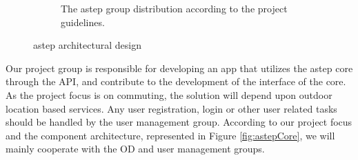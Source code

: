 \begin{figure}[h!]
\begin{subfigure}[b]{0.48\textwidth}
		\caption{The \gls{astep} group distribution according to the project guidelines.}
		\label{fig:astepGroups}
	\end{subfigure}
	\caption{\gls{astep} architectural design}
	\label{fig:astepArchitecture}
\end{figure}

Our project group is responsible for developing an app that utilizes the \gls{astep} core through the API, and contribute to the development of the interface of the core.
As the project focus is on commuting, the solution will depend upon outdoor location based services.
Any user registration, login or other user related tasks should be handled by the user management group.
According to our project focus and the component architecture, represented in Figure \ref{fig:astepCore}, we will mainly cooperate with the OD and user management groups.

